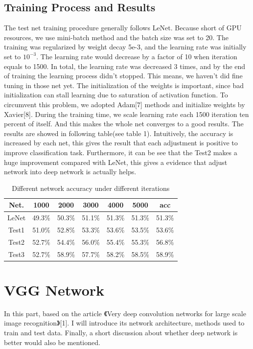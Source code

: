 \documentclass{article}
\begin{document}
\subsection{Training Process and Results}
	The test net training procedure generally follows LeNet. Because short of GPU resources, we use mini-batch method and the batch size was set to 20. The training was regularized by weight decay 5e-3, and the learning rate was initially set to $10^{-3}$. The learning rate would decrease by a factor of 10 when iteration equals to 1500. In total, the learning rate was decreased 3 times, and by the end of training the learning process didn't stopped. This means, we haven't did fine tuning in those net yet. 
	The initialization of the weights is important, since bad initialization can stall learning due to saturation of activation function. To circumvent this problem, we adopted Adam[7] methods and initialize weights by Xavier[8]. During the training time, we scale learning rate each 1500 iteration ten percent of itself. And this makes the whole net converges to a good results. The results are showed in following table(see table 1). Intuitively, the accuracy is increased by each net, this gives the result that each adjustment is positive to improve classification task. Furthermore, it can be see that the Test2 makes a huge improvement compared with LeNet, this gives a evidence that adjust network into deep network is actually helps. 
\begin{table}
\centering
	\begin{tabular}[b!]{|c|c|c|c|c|c|c|}
	\hline
	Net. & 1000 & 2000 & 3000 & 4000 & 5000 & acc\\
	\hline
	LeNet & 49.3\% & 50.3\% & 51.1\% & 51.3\% & 51.3\% & 51.3\% \\
	Test1 & 51.0\% & 52.8\% & 53.3\% & 53.6\% & 53.5\% & 53.6\% \\
	Test2 & 52.7\% & 54.4\% & 56.0\% & 55.4\% & 55.3\% & 56.8\% \\
	Test3 & 52.7\% & 58.9\% & 57.7\% & 58.2\% & 58.5\% & 58.9\% \\
	\hline
	\end{tabular}
\caption{Different network accuracy under different iterations}
\label{table:1}
\end{table}
\section{VGG Network}
In this part, based on the article 《Very deep convolution networks for large scale image recognition》[1]. I will introduce its network architecture, methods used to train and test data. Finally, a short discussion about whether deep network is better would also be mentioned. 
\end{document}
